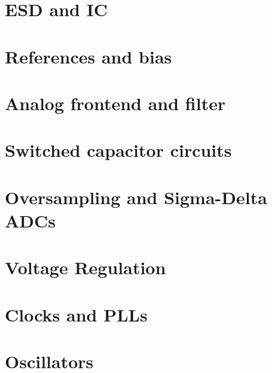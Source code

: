\documentclass[11pt,twoside,openright]{book}
\begin{document}
\chapter{ESD and IC}


\chapter{References and bias}


\chapter{Analog frontend and filter}


\chapter{Switched capacitor circuits}


\chapter{Oversampling and Sigma-Delta ADCs}


\chapter{Voltage Regulation}


\chapter{Clocks and PLLs}


\chapter{Oscillators}


%

%

%

%


%


\backmatter
\end{document}
